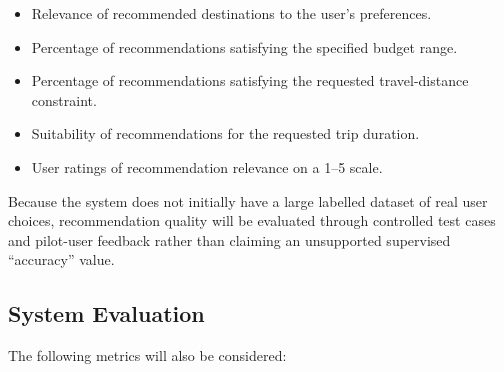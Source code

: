 \documentclass[11pt,a4paper]{article}
\begin{document}
\begin{itemize}

\item Relevance of recommended destinations to the user's preferences.

\item Percentage of recommendations satisfying the specified budget range.

\item Percentage of recommendations satisfying the requested travel-distance constraint.

\item Suitability of recommendations for the requested trip duration.

\item User ratings of recommendation relevance on a 1--5 scale.

\end{itemize}

Because the system does not initially have a large labelled dataset of real user choices, recommendation quality will be evaluated through controlled test cases and pilot-user feedback rather than claiming an unsupported supervised ``accuracy'' value.


\subsection{System Evaluation}

The following metrics will also be considered:
\end{document}
